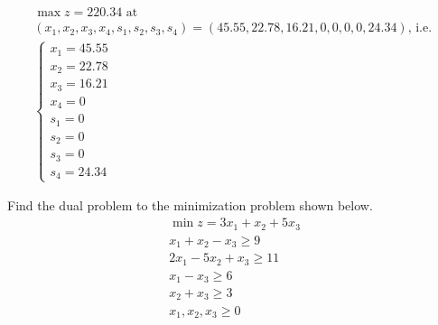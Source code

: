 \documentclass[12pt,letterpaper]{exam}
\begin{document}
\begin{questions}
\[{\begin{gathered}
	\max z= 220.34 \text{ at} \\
	(x_1, x_2, x_3, x_4, s_1, s_2, s_3, s_4)= (45.55, 22.78, 16.21, 0, 0, 0, 0, 24.34) \text{, i.e. } \\
	\begin{cases}
	x_1= 45.55 \\
	x_2= 22.78 \\
	x_3= 16.21 \\
	x_4= 0 \\
	s_1= 0 \\
	s_2= 0 \\
	s_3= 0 \\
	s_4= 24.34
	\end{cases}
	\end{gathered}
	}
	\]



\newpage
\question[10] Find the dual problem to the minimization problem shown below. 
	\[
	\begin{gathered}
	\min z= 3x_1 + x_2 + 5x_3 \\
	x_1 + x_2 - x_3 \geq 9 \\
	2x_1 - 5x_2 + x_3 \geq 11 \\
	x_1 - x_3 \geq 6 \\
	x_2 + x_3 \geq 3 \\
	x_1, x_2, x_3 \geq 0 
	\end{gathered}
	\] \pspace


\end{questions}
\end{document}
